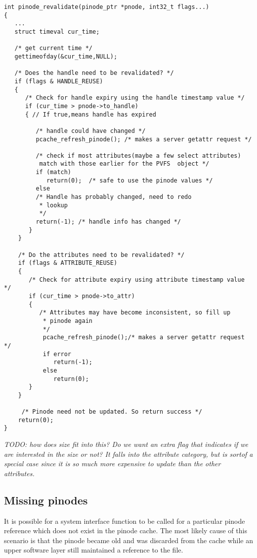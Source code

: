 \documentclass[11pt, letterpaper]{article}
\begin{document}
\begin{verbatim}
int pinode_revalidate(pinode_ptr *pnode, int32_t flags...)
{
   ...
   struct timeval cur_time; 

   /* get current time */
   gettimeofday(&cur_time,NULL);
   
   /* Does the handle need to be revalidated? */
   if (flags & HANDLE_REUSE)
   {
      /* Check for handle expiry using the handle timestamp value */
      if (cur_time > pnode->to_handle)
      { // If true,means handle has expired

         /* handle could have changed */
         pcache_refresh_pinode(); /* makes a server getattr request */
			
         /* check if most attributes(maybe a few select attributes)
          match with those earlier for the PVFS  object */
         if (match)
            return(0);	/* safe to use the pinode values */
         else 
         /* Handle has probably changed, need to redo 
          * lookup 
          */
         return(-1); /* handle info has changed */
       }
    }
		
    /* Do the attributes need to be revalidated? */
    if (flags & ATTRIBUTE_REUSE)
    {
       /* Check for attribute expiry using attribute timestamp value */  
       if (cur_time > pnode->to_attr) 
       {
          /* Attributes may have become inconsistent, so fill up
           * pinode again
           */
           pcache_refresh_pinode();/* makes a server getattr request */	
           if error
              return(-1);
           else 
              return(0);
       }
    }

  	 /* Pinode need not be updated. So return success */
    return(0);
}
\end{verbatim}
		 
\emph{TODO: how does size fit into this?  Do we want an extra flag that
indicates if we are interested in the size or not?  It falls into the
attribute category, but is sortof a special case since it is so much
more expensive to update than the other attributes.}

\subsection{Missing pinodes}

It is possible for a system interface function to be called for a
particular pinode reference which does not exist in the pinode
cache.  The most likely cause of this scenario is that the pinode
became old and was discarded from the cache while an upper
software layer still maintained a reference to the file.
\end{document}
